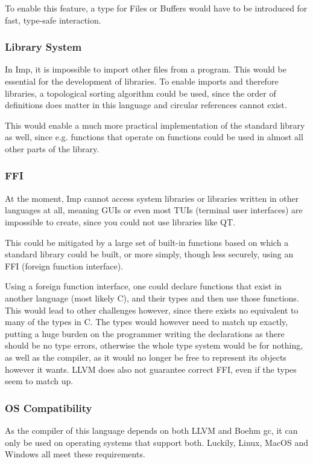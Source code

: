 \documentclass[12pt]{article}
\begin{document}
To enable this feature, a type for Files or Buffers would have to be
introduced for fast, type-safe interaction.

\subsubsection{Library System}
In Imp, it is impossible to import other files from a program.
This would be essential for the development of libraries.
To enable imports and therefore libraries, a topological sorting
algorithm could be used, since the order of definitions does
matter in this language and circular references cannot exist.

This would enable a much more practical implementation of the standard
library as well, since e.g. functions that operate on functions could be used
in almost all other parts of the library.

\subsubsection{FFI}
At the moment, Imp cannot access system libraries or libraries
written in other languages at all, meaning GUIs or even most TUIs
(terminal user interfaces) are impossible to create,
since you could not use libraries like QT.

This could be mitigated by a large set of built-in functions based
on which a standard library could be built, or more simply, though
less securely, using an FFI (foreign function interface).

Using a foreign function interface, one could declare functions that
exist in another language (most likely C), and their types and then use
those functions. This would lead to other challenges however, since
there exists no equivalent to many of the types in C.
The types would however need to match up exactly,
putting a huge burden on the programmer writing the declarations
as there should be no type errors, otherwise the whole type system
would be for nothing, as well as the compiler, as it would no longer
be free to represent its objects however it wants.
LLVM does also not guarantee correct FFI, even if the types
seem to match up.

\subsubsection{OS Compatibility}
As the compiler of this language depends on both
LLVM and Boehm \Gls{gc}, it can only be used on operating systems
that support both. Luckily, Linux, MacOS and Windows all meet these requirements.
\end{document}
